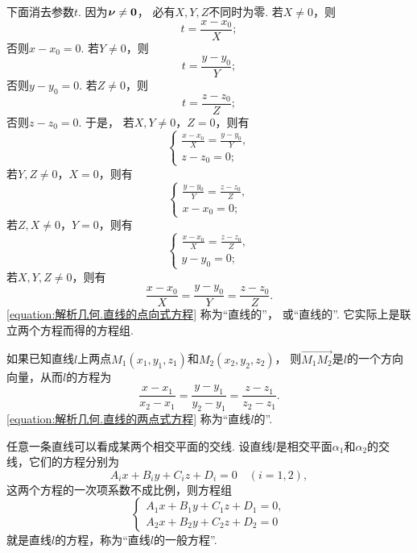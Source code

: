 下面消去参数\(t\).
因为\(\boldsymbol{\nu}\neq\boldsymbol{0}\)，
必有\(X,Y,Z\)不同时为零.
若\(X\neq0\)，则\[
	t = \frac{x - x_0}{X};
\]
否则\(x - x_0 = 0\).
若\(Y\neq0\)，则\[
	t = \frac{y - y_0}{Y};
\]
否则\(y - y_0 = 0\).
若\(Z\neq0\)，则\[
	t = \frac{z - z_0}{Z};
\]
否则\(z - z_0 = 0\).
于是，
若\(X,Y\neq0\)，\(Z=0\)，则有
\begin{equation}
	\left\{ \begin{array}{l}
		\frac{x - x_0}{X}
		= \frac{y - y_0}{Y}, \\
		z - z_0 = 0;
	\end{array} \right.
\end{equation}
若\(Y,Z\neq0\)，\(X=0\)，则有
\begin{equation}
	\left\{ \begin{array}{l}
		\frac{y - y_0}{Y}
		= \frac{z - z_0}{Z}, \\
		x - x_0 = 0;
	\end{array} \right.
\end{equation}
若\(Z,X\neq0\)，\(Y=0\)，则有
\begin{equation}
	\left\{ \begin{array}{l}
		\frac{x - x_0}{X}
		= \frac{z - z_0}{Z}, \\
		y - y_0 = 0;
	\end{array} \right.
\end{equation}
若\(X,Y,Z\neq0\)，则有
\begin{equation}\label{equation:解析几何.直线的点向式方程}
	\frac{x - x_0}{X}
	= \frac{y - y_0}{Y}
	= \frac{z - z_0}{Z}.
\end{equation}
\cref{equation:解析几何.直线的点向式方程}
称为“直线的”，
或“直线的”.
它实际上是联立两个方程而得的方程组.

如果已知直线\(l\)上两点\(M_1(x_1,y_1,z_1)\)和\(M_2(x_2,y_2,z_2)\)，
则\(\vec{M_1 M_2}\)是\(l\)的一个方向向量，从而\(l\)的方程为
\begin{equation}\label{equation:解析几何.直线的两点式方程}
	\frac{x - x_1}{x_2 - x_1}
	= \frac{y - y_1}{y_2 - y_1}
	= \frac{z - z_1}{z_2 - z_1}.
\end{equation}
\cref{equation:解析几何.直线的两点式方程}
称为“直线\(l\)的”.

任意一条直线可以看成某两个相交平面的交线.
设直线\(l\)是相交平面\(\alpha_1\)和\(\alpha_2\)的交线，它们的方程分别为\[
	A_i x + B_i y + C_i z + D_i = 0
	\quad(i=1,2),
\]
这两个方程的一次项系数不成比例，则方程组
\begin{equation}
	\left\{ \begin{array}{l}
		A_1 x + B_1 y + C_1 z + D_1 = 0, \\
		A_2 x + B_2 y + C_2 z + D_2 = 0
	\end{array} \right.
\end{equation}
就是直线\(l\)的方程，称为“直线\(l\)的一般方程”.

